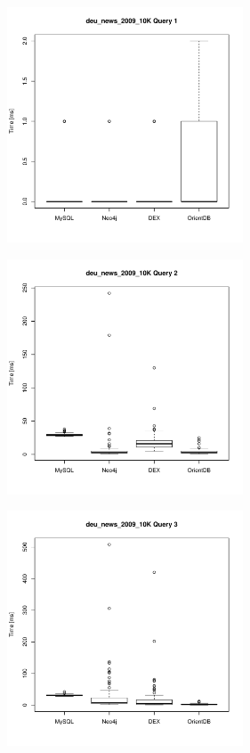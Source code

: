 \documentclass[11pt, a4paper, oneside]{article} %
\begin{document}
\begin{appendix}
\begin{landscape}
	\begin{figure}[ht]
		\begin{minipage}[hbt]{6.5cm}
			\centering
			\includegraphics[width=7cm]{../results/cold caches/images/10K_query1_boxplot}
			\label{fig:10K_query1_boxplot}
		\end{minipage}
		\hfill
		\begin{minipage}[hbt]{6.5cm}
			\centering
			\includegraphics[width=7cm]{../results/cold caches/images/10K_query2_boxplot}
			\label{fig:10K_query2_boxplot}
		\end{minipage}
		\hfill
		\begin{minipage}[hbt]{6.5cm}
			\centering
			\includegraphics[width=7cm]{../results/cold caches/images/10K_query3_boxplot}
			\label{fig:10K_query3_boxplot}
		\end{minipage}
		

\end{figure}
\end{landscape}
\end{appendix}
\end{document}
